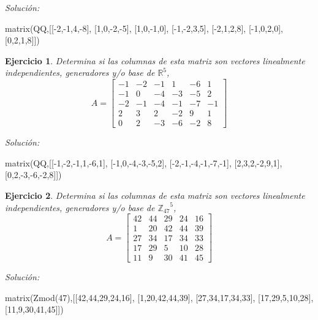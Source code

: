 \documentclass{amsart}
\newtheorem{ejer}{Ejercicio}
\begin{document}
{\it Soluci\'on:}

\begin{sageblock}
matrix(QQ,[[-2,-1,4,-8],
[1,0,-2,-5],
[1,0,-1,0],
[-1,-2,3,5],
[-2,1,2,8],
[-1,0,2,0],
[0,2,1,8]])
\end{sageblock}



\begin{ejer} Determina si las columnas de esta matriz son vectores linealmente independientes, generadores y/o base de ${{\mathbb R}}^{5}$,
\[ A = \left[\begin{array}{rrrrrr}
-1 & -2 & -1 & 1 & -6 & 1 \\
-1 & 0 & -4 & -3 & -5 & 2 \\
-2 & -1 & -4 & -1 & -7 & -1 \\
2 & 3 & 2 & -2 & 9 & 1 \\
0 & 2 & -3 & -6 & -2 & 8
\end{array}\right] \]
\end{ejer}

{\it Soluci\'on:}

\begin{sageblock}
matrix(QQ,[[-1,-2,-1,1,-6,1],
[-1,0,-4,-3,-5,2],
[-2,-1,-4,-1,-7,-1],
[2,3,2,-2,9,1],
[0,2,-3,-6,-2,8]])
\end{sageblock}



\begin{ejer} Determina si las columnas de esta matriz son vectores linealmente independientes, generadores y/o base de ${{\mathbb Z}_{47}}^{5}$,
\[ A = \left[\begin{array}{rrrrr}
42 & 44 & 29 & 24 & 16 \\
1 & 20 & 42 & 44 & 39 \\
27 & 34 & 17 & 34 & 33 \\
17 & 29 & 5 & 10 & 28 \\
11 & 9 & 30 & 41 & 45
\end{array}\right] \]
\end{ejer}

{\it Soluci\'on:}

\begin{sageblock}
matrix(Zmod(47),[[42,44,29,24,16],
[1,20,42,44,39],
[27,34,17,34,33],
[17,29,5,10,28],
[11,9,30,41,45]])
\end{sageblock}
\end{document}
